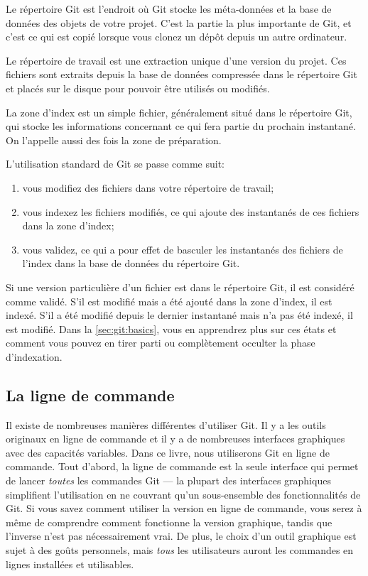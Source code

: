 Le répertoire Git est l'endroit où Git stocke les méta-données et la base de données des objets de votre projet.
C'est la partie la plus importante de Git, et c'est ce qui est copié lorsque vous clonez un dépôt depuis un autre ordinateur.

Le répertoire de travail est une extraction unique d'une version du projet.
Ces fichiers sont extraits depuis la base de données compressée dans le répertoire Git et placés sur le disque pour pouvoir être utilisés ou modifiés.

La zone d'index est un simple fichier, généralement situé dans le répertoire Git, qui stocke les informations concernant ce qui fera partie du prochain instantané. On l'appelle aussi des fois la zone de préparation.

L'utilisation standard de Git se passe comme suit:
\begin{enumerate}
\item vous modifiez des fichiers dans votre répertoire de travail;
\item vous indexez les fichiers modifiés, ce qui ajoute des instantanés de ces fichiers dans la zone d'index;
\item vous validez, ce qui a pour effet de basculer les instantanés des fichiers de l'index dans la base de données du répertoire Git.
\end{enumerate}

Si une version particulière d'un fichier est dans le répertoire Git, il est considéré comme validé.
S'il est modifié mais a été ajouté dans la zone d'index, il est indexé.
S'il a été modifié depuis le dernier instantané mais n'a pas été indexé, il est modifié.
Dans la \autoref{sec:git:basics}, vous en apprendrez plus sur ces états et comment vous pouvez en tirer parti ou complètement occulter la phase d'indexation.

\subsection{La ligne de commande}

Il existe de nombreuses manières différentes d'utiliser Git.
Il y a les outils originaux en ligne de commande et il y a de nombreuses interfaces graphiques avec des capacités variables.
Dans ce livre, nous utiliserons Git en ligne de commande.
Tout d'abord, la ligne de commande est la seule interface qui permet de lancer \emph{toutes} les commandes Git --- la plupart des interfaces graphiques simplifient l'utilisation en ne couvrant qu'un sous-ensemble des fonctionnalités de Git.
Si vous savez comment utiliser la version en ligne de commande, vous serez à même de comprendre comment fonctionne la version graphique, tandis que l'inverse n'est pas nécessairement vrai.
De plus, le choix d'un outil graphique est sujet à des goûts personnels, mais \emph{tous} les utilisateurs auront les commandes en lignes installées et utilisables.

